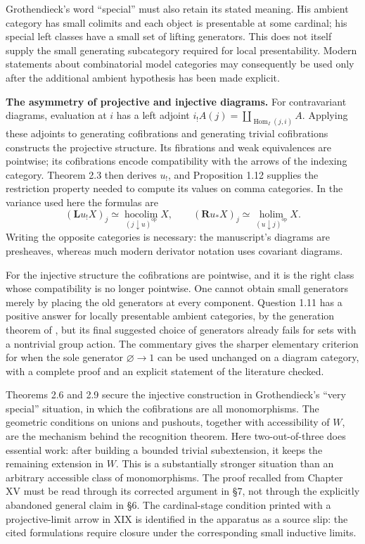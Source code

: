 Grothendieck's word ``special'' must also retain its stated meaning. His
ambient category has small colimits and each object is presentable at some
cardinal; his special left classes have a small set of lifting generators.
This does not itself supply the small generating subcategory required for
local presentability. Modern statements about combinatorial model categories
may consequently be used only after the additional ambient hypothesis has
been made explicit.

\noindent\textbf{The asymmetry of projective and injective diagrams.}
For contravariant diagrams, evaluation at $i$ has a left adjoint
$i_!A(j)=\coprod_{\operatorname{Hom}_I(j,i)}A$. Applying these adjoints to
generating cofibrations and generating trivial cofibrations constructs the
projective structure. Its fibrations and weak equivalences are pointwise;
its cofibrations encode compatibility with the arrows of the indexing
category. Theorem 2.3 then derives $u_!$, and Proposition 1.12 supplies the
restriction property needed to compute its values on comma categories.
In the variance used here the formulas are
\[
 (\mathbf L u_!X)_j\simeq
   \operatorname*{hocolim}_{(j\downarrow u)^{\mathrm{op}}}X,
 \qquad
 (\mathbf R u_*X)_j\simeq
   \operatorname*{holim}_{(u\downarrow j)^{\mathrm{op}}}X.
\]
Writing the opposite categories is necessary: the manuscript's diagrams
are presheaves, whereas much modern derivator notation uses covariant
diagrams.

For the injective structure the cofibrations are pointwise, and it is the
right class whose compatibility is no longer pointwise. One cannot obtain
small generators merely by placing the old generators at every component.
Question 1.11 has a positive answer for locally presentable ambient
categories, by the generation theorem of \citet[Lemma A.2.8.3]{Lurie2009HTT},
but its final suggested choice of generators already fails for sets with a
nontrivial group action. The commentary gives the sharper elementary
criterion for when the sole generator $\varnothing\to 1$ can be used unchanged
on a diagram category, with a complete proof and an explicit statement of
the literature checked.

Theorems 2.6 and 2.9 secure the injective construction in Grothendieck's
``very special'' situation, in which the cofibrations are all monomorphisms.
The geometric conditions on unions and pushouts, together with accessibility
of $W$, are the mechanism behind the recognition theorem. Here two-out-of-three
does essential work: after building a bounded trivial subextension, it keeps
the remaining extension in $W$. This is a substantially stronger situation
than an arbitrary accessible class of monomorphisms. The proof recalled
from Chapter XV must be read through its corrected argument in \S7, not
through the explicitly abandoned general claim in \S6. The cardinal-stage
condition printed with a projective-limit arrow in XIX is identified in the
apparatus as a source slip: the cited formulations require closure under
the corresponding small inductive limits.

